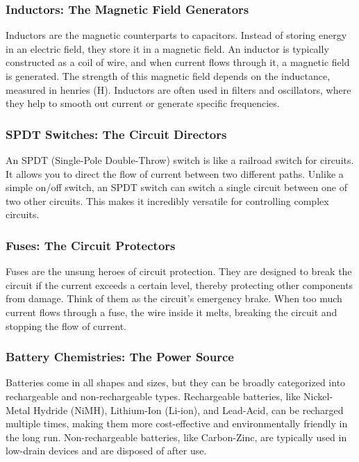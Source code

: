 \subsubsection*{Inductors: The Magnetic Field Generators}
Inductors are the magnetic counterparts to capacitors. Instead of storing energy in an electric field, they store it in a magnetic field. An inductor is typically constructed as a coil of wire, and when current flows through it, a magnetic field is generated. The strength of this magnetic field depends on the inductance, measured in henries (H). Inductors are often used in filters and oscillators, where they help to smooth out current or generate specific frequencies.

\subsubsection*{SPDT Switches: The Circuit Directors}
An SPDT (Single-Pole Double-Throw) switch is like a railroad switch for circuits. It allows you to direct the flow of current between two different paths. Unlike a simple on/off switch, an SPDT switch can switch a single circuit between one of two other circuits. This makes it incredibly versatile for controlling complex circuits.

\subsubsection*{Fuses: The Circuit Protectors}
Fuses are the unsung heroes of circuit protection. They are designed to break the circuit if the current exceeds a certain level, thereby protecting other components from damage. Think of them as the circuit's emergency brake. When too much current flows through a fuse, the wire inside it melts, breaking the circuit and stopping the flow of current.

\subsubsection*{Battery Chemistries: The Power Source}
Batteries come in all shapes and sizes, but they can be broadly categorized into rechargeable and non-rechargeable types. Rechargeable batteries, like Nickel-Metal Hydride (NiMH), Lithium-Ion (Li-ion), and Lead-Acid, can be recharged multiple times, making them more cost-effective and environmentally friendly in the long run. Non-rechargeable batteries, like Carbon-Zinc, are typically used in low-drain devices and are disposed of after use.

